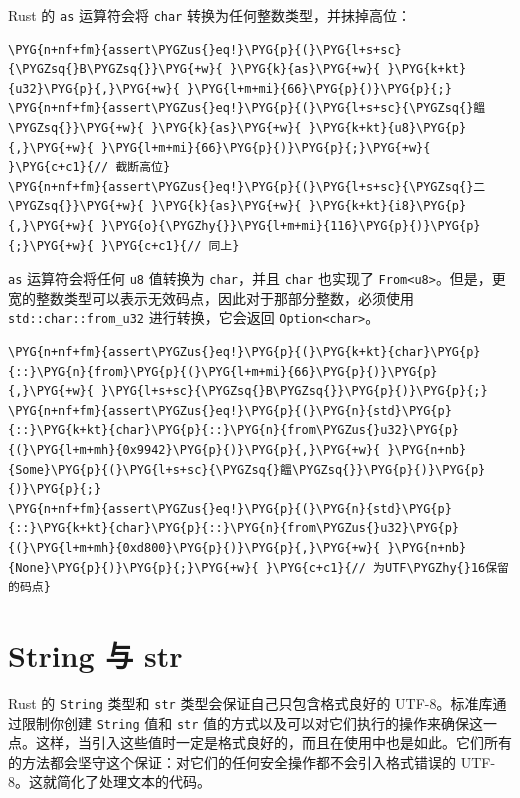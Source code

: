 Rust 的 \texttt{as} 运算符会将 \texttt{char} 转换为任何整数类型，并抹掉高位：

\begin{Verbatim}[commandchars=\\\{\},breaklines=true,breakanywhere=true,fontsize=\codefont,xleftmargin=17bp]
\PYG{n+nf+fm}{assert\PYGZus{}eq!}\PYG{p}{(}\PYG{l+s+sc}{\PYGZsq{}B\PYGZsq{}}\PYG{+w}{ }\PYG{k}{as}\PYG{+w}{ }\PYG{k+kt}{u32}\PYG{p}{,}\PYG{+w}{ }\PYG{l+m+mi}{66}\PYG{p}{)}\PYG{p}{;}
\PYG{n+nf+fm}{assert\PYGZus{}eq!}\PYG{p}{(}\PYG{l+s+sc}{\PYGZsq{}饂\PYGZsq{}}\PYG{+w}{ }\PYG{k}{as}\PYG{+w}{ }\PYG{k+kt}{u8}\PYG{p}{,}\PYG{+w}{ }\PYG{l+m+mi}{66}\PYG{p}{)}\PYG{p}{;}\PYG{+w}{   }\PYG{c+c1}{// 截断高位}
\PYG{n+nf+fm}{assert\PYGZus{}eq!}\PYG{p}{(}\PYG{l+s+sc}{\PYGZsq{}二\PYGZsq{}}\PYG{+w}{ }\PYG{k}{as}\PYG{+w}{ }\PYG{k+kt}{i8}\PYG{p}{,}\PYG{+w}{ }\PYG{o}{\PYGZhy{}}\PYG{l+m+mi}{116}\PYG{p}{)}\PYG{p}{;}\PYG{+w}{ }\PYG{c+c1}{// 同上}
\end{Verbatim}

\texttt{as} 运算符会将任何 \texttt{u8} 值转换为 \texttt{char}，并且 \texttt{char} 也实现了 \texttt{From<u8>}。但是，更宽的整数类型可以表示无效码点，因此对于那部分整数，必须使用 \texttt{std::char::from\_u32} 进行转换，它会返回 \texttt{Option<char>}。

\begin{Verbatim}[commandchars=\\\{\},breaklines=true,breakanywhere=true,fontsize=\codefont,xleftmargin=17bp]
\PYG{n+nf+fm}{assert\PYGZus{}eq!}\PYG{p}{(}\PYG{k+kt}{char}\PYG{p}{::}\PYG{n}{from}\PYG{p}{(}\PYG{l+m+mi}{66}\PYG{p}{)}\PYG{p}{,}\PYG{+w}{ }\PYG{l+s+sc}{\PYGZsq{}B\PYGZsq{}}\PYG{p}{)}\PYG{p}{;}
\PYG{n+nf+fm}{assert\PYGZus{}eq!}\PYG{p}{(}\PYG{n}{std}\PYG{p}{::}\PYG{k+kt}{char}\PYG{p}{::}\PYG{n}{from\PYGZus{}u32}\PYG{p}{(}\PYG{l+m+mh}{0x9942}\PYG{p}{)}\PYG{p}{,}\PYG{+w}{ }\PYG{n+nb}{Some}\PYG{p}{(}\PYG{l+s+sc}{\PYGZsq{}饂\PYGZsq{}}\PYG{p}{)}\PYG{p}{)}\PYG{p}{;}
\PYG{n+nf+fm}{assert\PYGZus{}eq!}\PYG{p}{(}\PYG{n}{std}\PYG{p}{::}\PYG{k+kt}{char}\PYG{p}{::}\PYG{n}{from\PYGZus{}u32}\PYG{p}{(}\PYG{l+m+mh}{0xd800}\PYG{p}{)}\PYG{p}{,}\PYG{+w}{ }\PYG{n+nb}{None}\PYG{p}{)}\PYG{p}{;}\PYG{+w}{ }\PYG{c+c1}{// 为UTF\PYGZhy{}16保留的码点}
\end{Verbatim}

\section{String 与 str}

Rust 的 \texttt{String} 类型和 \texttt{str} 类型会保证自己只包含格式良好的 UTF-8。标准库通过限制你创建 \texttt{String} 值和 \texttt{str} 值的方式以及可以对它们执行的操作来确保这一点。这样，当引入这些值时一定是格式良好的，而且在使用中也是如此。它们所有的方法都会坚守这个保证：对它们的任何安全操作都不会引入格式错误的 UTF-8。这就简化了处理文本的代码。

